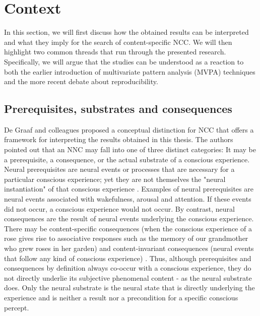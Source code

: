 \section{Context}
In this section, we will first discuss how the obtained results can be interpreted and what they imply for the search of content-specific NCC. We will then highlight two common threads that run through the presented research. Specifically, we will argue that the studies can be understood as a reaction to both the earlier introduction of multivariate pattern analysis (MVPA) techniques and the more recent debate about reproducibility.

\subsection{Prerequisites, substrates and consequences}
De Graaf and colleagues \parencite*{DeGraaf2012} proposed a conceptual distinction for NCC that offers a framework for interpreting the results obtained in this thesis. The authors pointed out that an NNC may fall into one of three distinct categories: It may be a prerequisite, a consequence, or the actual substrate of a conscious experience. Neural prerequisites are neural events or processes that are necessary for a particular conscious experience; yet they are not themselves the "neural instantiation" of that conscious experience \parencite{DeGraaf2012}. Examples of neural prerequisites are neural events associated with wakefulness, arousal and attention. If these events did not occur, a conscious experience would not occur. By contrast, neural consequences are the result of neural events underlying the conscious experience. There may be content-specific consequences (when the conscious experience of a rose gives rise to associative responses such as the memory of our grandmother who grew roses in her garden) and content-invariant consequences (neural events that follow any kind of conscious experience) \parencite{DeGraaf2012}. Thus, although prerequisites and consequences by definition always co-occur with a conscious experience, they do not directly underlie its subjective phenomenal content - as the neural substrate does. Only the neural substrate is the neural state that is directly underlying the experience and is neither a result nor a precondition for a specific conscious percept.

